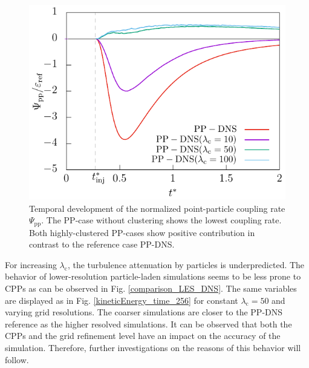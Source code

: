 \documentclass[11pt,a4paper,openany,oneside,parskip=half*]{article}
\begin{document}
\begin{figure}[htb]
\begin{minipage}[t]{0.5\textwidth}
        \includegraphics[width=\linewidth]{./Abbildungen/256/coupling_time.pdf}
        \caption{Temporal development of the normalized point-particle coupling rate $\Psi_\mathrm{pp}$. The PP-case without clustering shows the lowest coupling rate. Both highly-clustered PP-cases show positive contribution in contrast to the reference case PP-DNS.}
        \label{coupling_time_256}
    \end{minipage}
\end{figure}%
For increasing $\lambda_\mathrm{c}$, the turbulence attenuation by particles is underpredicted.
The behavior of lower-resolution particle-laden simulations seems to be less prone to CPPs as can be observed in Fig. \ref{comparison_LES_DNS}. The same variables are displayed as in Fig. \ref{kineticEnergy_time_256} for constant $\lambda_\mathrm{c}=50$ and varying grid resolutions. The coarser simulations are closer to the PP-DNS reference as the higher resolved simulations.
It can be observed that both the CPPs and the grid refinement level have an impact on the accuracy of the simulation. Therefore, further investigations on the reasons of this behavior will follow.
\end{document}

